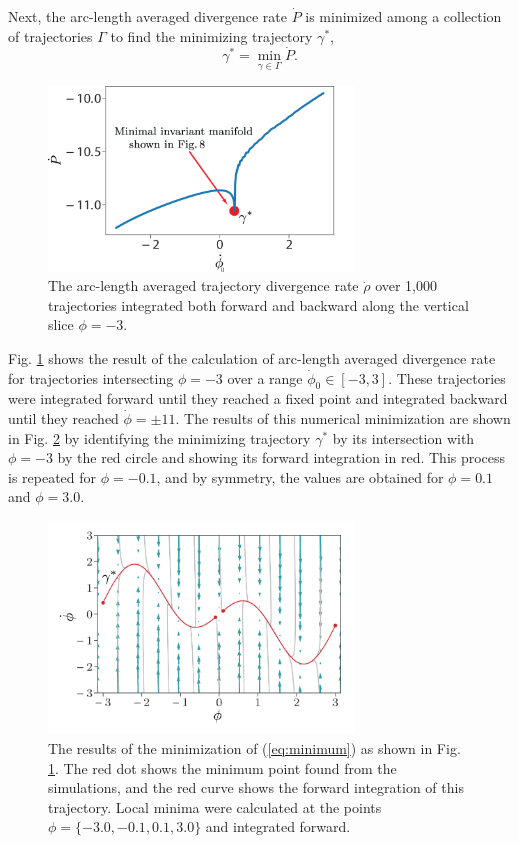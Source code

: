 \documentclass[twocolumn]{svjour3}
\begin{document}
Next, the arc-length averaged divergence rate $\dot{P}$ is minimized among a collection of trajectories $\Gamma$ to find the minimizing trajectory $\gamma^*$,
\begin{equation}\label{eq:minimum}
\gamma^*=\min_{\gamma\in\Gamma}\dot{P}.
\end{equation}
\begin{figure}
\centering
\includegraphics[width=3.2in]{rho-dot-field-update.png}
\caption{The arc-length averaged trajectory divergence rate $\dot{\rho}$ over 1,000 trajectories integrated both forward and backward along the vertical slice $\phi=-3$.}
\label{fig:min-rhodot}
\end{figure}

Fig. \ref{fig:min-rhodot} shows the result of the calculation of arc-length averaged divergence rate for trajectories intersecting $\phi=-3$ over a range $\dot{\phi}_0\in[-3, 3]$. These trajectories were integrated forward until they reached a fixed point and integrated backward until they reached $\dot{\phi}=\pm11$. The results of this numerical minimization are shown in Fig. \ref{fig:min-rhodot-comp} by identifying the minimizing trajectory $\gamma^*$ by its intersection with $\phi=-3$ by the red circle and showing its forward integration in red. This process is repeated for $\phi=-0.1$, and by symmetry, the values are obtained for $\phi=0.1$ and $\phi=3.0$.

\begin{figure}
\centering
\includegraphics[width=3.2in]{min-rho-dot-mod.png}
\caption{The results of the minimization of (\ref{eq:minimum}) as shown in Fig. \ref{fig:min-rhodot}. The red dot shows the minimum point found from the simulations, and the red curve shows the forward integration of this trajectory. Local minima were calculated at the points $\phi=\{-3.0, -0.1, 0.1, 3.0\}$ and integrated forward.}
\label{fig:min-rhodot-comp}
\end{figure}
\end{document}
